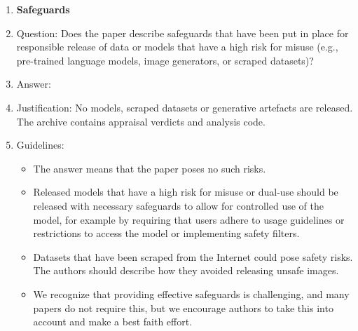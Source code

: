 \documentclass{article}
\begin{document}
\begin{enumerate}
\item {\bf Safeguards}
    \item[] Question: Does the paper describe safeguards that have been put in place for responsible release of data or models that have a high risk for misuse (e.g., pre-trained language models, image generators, or scraped datasets)?
    \item[] Answer: \answerNA{}
    \item[] Justification: No models, scraped datasets or generative artefacts are released. The archive contains appraisal verdicts and analysis code.
    \item[] Guidelines:
    \begin{itemize}
        \item The answer \answerNA{} means that the paper poses no such risks.
        \item Released models that have a high risk for misuse or dual-use should be released with necessary safeguards to allow for controlled use of the model, for example by requiring that users adhere to usage guidelines or restrictions to access the model or implementing safety filters. 
        \item Datasets that have been scraped from the Internet could pose safety risks. The authors should describe how they avoided releasing unsafe images.
        \item We recognize that providing effective safeguards is challenging, and many papers do not require this, but we encourage authors to take this into account and make a best faith effort.
    \end{itemize}


\end{enumerate}
\end{document}
